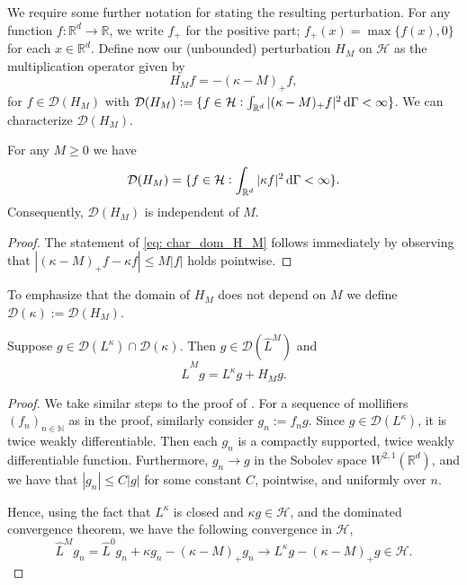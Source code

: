 \documentclass{aptpub}
\newcommand{\R}{\mathbb R}
\newcommand{\Rd}{\mathbb R^d}
\newcommand{\Lk}{L^\kappa}
\newcommand{\Dom}{\mathcal D}
\renewcommand{\H}{\mathcal H}
\begin{document}
We require some further notation for stating the resulting perturbation. For any function $f:\Rd \to \R$, we write $f_+$ for the positive part; $f_+(x)=\max\{f(x),0\}$ for each $x\in \Rd$. Define now our (unbounded) perturbation $H_M$ on $\H$ as the multiplication operator given by
\begin{equation*}
    H_M f = -(\kappa -M)_+f,
\end{equation*}
for $f \in \Dom(H_M)$ with $\Dom(H_M):=\{f\in \H: \int_{\Rd} |(\kappa - M)_+ f|^2 \dif \Gamma <\infty\} $. 
We can characterize $\Dom(H_M)$.
\begin{lemma}
    For any $M\geq 0$ we have
    \begin{equation}  \label{eq: char_dom_H_M}
        \Dom(H_M) = \{f\in \H: \int_{\Rd}|\kappa f|^2\dif \Gamma <\infty\}. 
    \end{equation}
    Consequently, $\Dom(H_M)$ is independent of $M$.
\end{lemma}
\begin{proof}
    The statement of \eqref{eq: char_dom_H_M} follows immediately by observing that $|(\kappa-M)_+f - \kappa f|\le M|f|$ holds pointwise.
\end{proof}
To emphasize that the domain of $H_M$ does not depend on $M$ we define $\Dom(\kappa):= \Dom(H_M)$.
\begin{lemma}\label{lemma:dom_LM}
    Suppose $g\in \Dom(\Lk)\cap\Dom(\kappa)$. 
    Then $g\in \Dom(\widehat{L}^M)$ and
    \begin{equation*}
        \widehat{L}^M g = L^\kappa g + H_M g.
    \end{equation*}
\end{lemma}
\begin{proof}
    We take similar steps to the proof of \cite[Lemma 15]{Wang2020+}. For a sequence of mollifiers $(f_n)_{n\in\mathbb{N}}$ as in the proof, similarly consider $g_n := f_n g$. Since $g \in \Dom(L^\kappa)$, it is twice weakly differentiable. Then each $g_n$ is a compactly supported, twice weakly differentiable function. Furthermore, $g_n \to g$ in the Sobolev space $W^{2,1}(\Rd)$, and we have that $|g_n| \le C|g|$ for some constant $C$, pointwise, and uniformly over $n$.
    
    Hence, using the fact that $L^\kappa$ is closed and $\kappa g \in \mathcal H$, and the dominated convergence theorem, we have the following convergence in $\mathcal H$,
    \begin{equation*}
        \widehat{L}^M g_n = \widehat{L}^0 g_n + \kappa g_n - (\kappa-M)_+ g_n  \longrightarrow L^\kappa g - (\kappa-M)_+ g \in \mathcal H.
    \end{equation*}
\end{proof}
\end{document}
